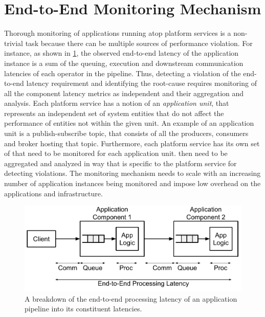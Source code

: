 \section{End-to-End Monitoring Mechanism}
\label{sec:monitoring_mechanism}
Thorough monitoring of applications running atop platform services is a non-trivial task because there can be multiple sources of performance violation. For instance, as shown in \cref{fig:pipeline_latencies}, the observed end-to-end latency of the application instance is a sum of the queuing, execution and downstream communication latencies of each operator in the pipeline.  Thus, detecting a violation of the end-to-end latency requirement and identifying the root-cause requires monitoring  of all the component latency metrics as independent   and their aggregation and analysis. Each platform service has a notion of an \textit{application unit}, that represents an independent set of system entities that do not affect the performance of entities not within the given unit. An example of an application unit is a publish-subscribe topic, that consists of all the producers, consumers and broker hosting that topic. Furthermore, each platform service has its own set of   that need to be monitored for each application unit.  then need to be aggregated and analyzed in way that is specific to the platform service for detecting violations. The monitoring mechanism needs to scale with an increasing number of application instances being monitored and impose low overhead on the applications and infrastructure.
\begin{figure}
\centering
\includegraphics[width=0.75\linewidth]{figures/mechanisms/monitoring/pipeline_latencies}
\caption{A breakdown of the end-to-end processing latency of an application pipeline into its constituent latencies.}
\label{fig:pipeline_latencies}
\end{figure}

